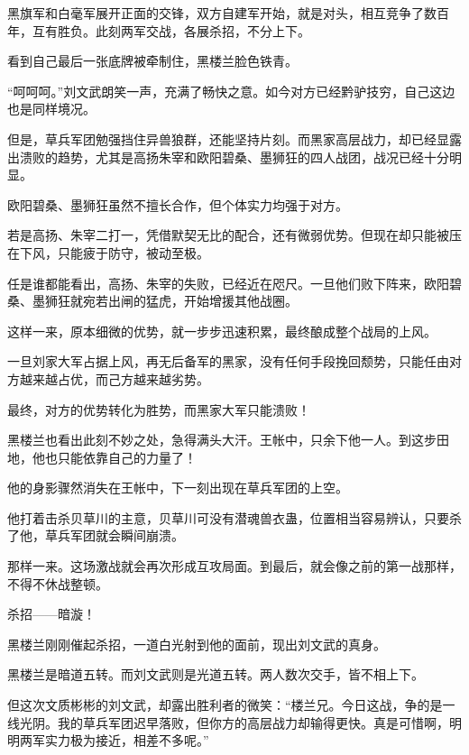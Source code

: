 
\begin{this_body}



黑旗军和白毫军展开正面的交锋，双方自建军开始，就是对头，相互竞争了数百年，互有胜负。此刻两军交战，各展杀招，不分上下。

看到自己最后一张底牌被牵制住，黑楼兰脸色铁青。

“呵呵呵。”刘文武朗笑一声，充满了畅快之意。如今对方已经黔驴技穷，自己这边也是同样境况。

但是，草兵军团勉强挡住异兽狼群，还能坚持片刻。而黑家高层战力，却已经显露出溃败的趋势，尤其是高扬朱宰和欧阳碧桑、墨狮狂的四人战团，战况已经十分明显。

欧阳碧桑、墨狮狂虽然不擅长合作，但个体实力均强于对方。

若是高扬、朱宰二打一，凭借默契无比的配合，还有微弱优势。但现在却只能被压在下风，只能疲于防守，被动至极。

任是谁都能看出，高扬、朱宰的失败，已经近在咫尺。一旦他们败下阵来，欧阳碧桑、墨狮狂就宛若出闸的猛虎，开始增援其他战圈。

这样一来，原本细微的优势，就一步步迅速积累，最终酿成整个战局的上风。

一旦刘家大军占据上风，再无后备军的黑家，没有任何手段挽回颓势，只能任由对方越来越占优，而己方越来越劣势。

最终，对方的优势转化为胜势，而黑家大军只能溃败！

黑楼兰也看出此刻不妙之处，急得满头大汗。王帐中，只余下他一人。到这步田地，他也只能依靠自己的力量了！

他的身影骤然消失在王帐中，下一刻出现在草兵军团的上空。

他打着击杀贝草川的主意，贝草川可没有潜魂兽衣蛊，位置相当容易辨认，只要杀了他，草兵军团就会瞬间崩溃。

那样一来。这场激战就会再次形成互攻局面。到最后，就会像之前的第一战那样，不得不休战整顿。

杀招——暗漩！

黑楼兰刚刚催起杀招，一道白光射到他的面前，现出刘文武的真身。

黑楼兰是暗道五转。而刘文武则是光道五转。两人数次交手，皆不相上下。

但这次文质彬彬的刘文武，却露出胜利者的微笑：“楼兰兄。今日这战，争的是一线光阴。我的草兵军团迟早落败，但你方的高层战力却输得更快。真是可惜啊，明明两军实力极为接近，相差不多呢。”


\end{this_body}

